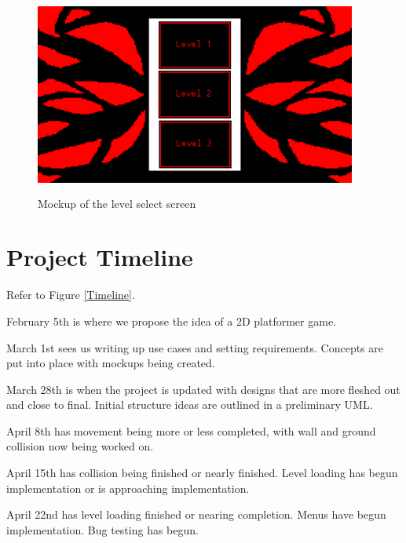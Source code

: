 \documentclass[10pt,conference,onecolumn,compsoc]{IEEEtran}
\begin{document}
\begin{figure}[ht!]
\includegraphics[height=250px, width=400px]{Select Mockup.png}
\caption{Mockup of the level select screen}
\label{Select Mockup}
\end{figure}



\section{Project Timeline}
Refer to Figure \ref{Timeline}.

February 5th is where we propose the idea of a 2D platformer game.

March 1st sees us writing up use cases and setting requirements. Concepts are put into place with mockups being created.

March 28th is when the project is updated with designs that are more fleshed out and close to final. Initial structure ideas are outlined in a preliminary UML.

April 8th has movement being more or less completed, with wall and ground collision now being worked on.

April 15th has collision being finished or nearly finished. Level loading has begun implementation or is approaching implementation.

April 22nd has level loading finished or nearing completion. Menus have begun implementation. Bug testing has begun.
\end{document}
